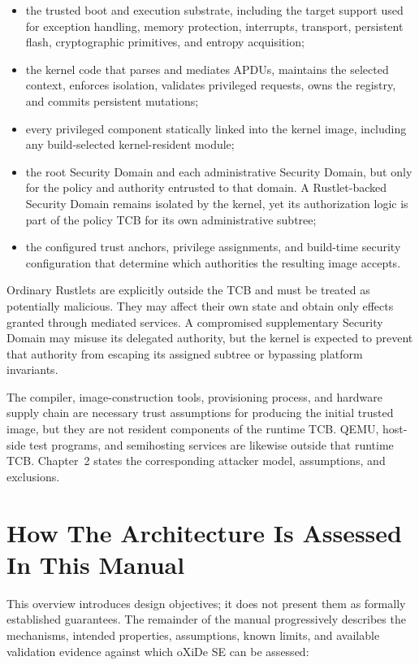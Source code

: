 \begin{itemize}
\item the trusted boot and execution substrate, including the target support
  used for exception handling, memory protection, interrupts, transport,
  persistent flash, cryptographic primitives, and entropy acquisition;
\item the kernel code that parses and mediates APDUs, maintains the selected
  context, enforces isolation, validates privileged requests, owns the registry,
  and commits persistent mutations;
\item every privileged component statically linked into the kernel image,
  including any build-selected kernel-resident module;
\item the root Security Domain and each administrative Security Domain, but only
  for the policy and authority entrusted to that domain. A Rustlet-backed
  Security Domain remains isolated by the kernel, yet its authorization logic
  is part of the policy TCB for its own administrative subtree;
\item the configured trust anchors, privilege assignments, and build-time
  security configuration that determine which authorities the resulting image
  accepts.
\end{itemize}

Ordinary Rustlets are explicitly outside the TCB and must be treated as
potentially malicious. They may affect their own state and obtain only effects
granted through mediated services. A compromised supplementary Security Domain
may misuse its delegated authority, but the kernel is expected to prevent that
authority from escaping its assigned subtree or bypassing platform invariants.

The compiler, image-construction tools, provisioning process, and hardware
supply chain are necessary trust assumptions for producing the initial trusted
image, but they are not resident components of the runtime TCB. QEMU, host-side
test programs, and semihosting services are likewise outside that runtime TCB.
Chapter~2 states the corresponding attacker model, assumptions, and exclusions.

\section{How The Architecture Is Assessed In This Manual}

This overview introduces design objectives; it does not present them as
formally established guarantees. The remainder of the manual progressively
describes the mechanisms, intended properties, assumptions, known limits, and
available validation evidence against which oXiDe SE can be assessed:


